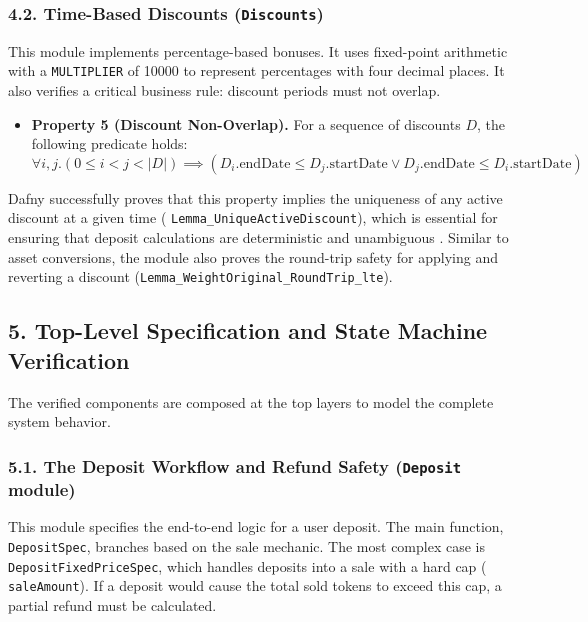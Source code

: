\documentclass[
  english,
  onecolumn]{article}
\providecommand{\tightlist}{%
  \setlength{\itemsep}{0pt}\setlength{\parskip}{0pt}}
\begin{document}
\subsubsection{\texorpdfstring{4.2. Time-Based Discounts
(\texttt{Discounts})}{4.2. Time-Based Discounts (Discounts)}}\label{time-based-discounts-discounts}

This module implements percentage-based bonuses. It uses fixed-point
arithmetic with a \texttt{MULTIPLIER} of 10000 to represent percentages
with four decimal places. It also verifies a critical business rule:
discount periods must not overlap.

\begin{itemize}
\tightlist
\item
  \textbf{Property 5 (Discount Non-Overlap).} For a sequence of
  discounts \(D\), the following predicate holds:
  \[ \forall i, j. (0 \le i < j < |D|) \implies (D_i.\text{endDate} \le D_j.\text{startDate} \lor D_j.\text{endDate} \le D_i.\text{startDate}) \]
\end{itemize}

Dafny successfully proves that this property implies the uniqueness of
any active discount at a given time (
\texttt{Lemma\_UniqueActiveDiscount}), which is essential for ensuring
that deposit calculations are deterministic and unambiguous
. Similar to asset
conversions, the module also proves the round-trip safety for applying
and reverting a discount
(\texttt{Lemma\_WeightOriginal\_RoundTrip\_lte}).

\subsection{5. Top-Level Specification and State Machine
Verification}\label{top-level-specification-and-state-machine-verification}

The verified components are composed at the top layers to model the
complete system behavior.

\subsubsection{\texorpdfstring{5.1. The Deposit Workflow and Refund
Safety (\texttt{Deposit}
module)}{5.1. The Deposit Workflow and Refund Safety (Deposit module)}}\label{the-deposit-workflow-and-refund-safety-deposit-module}

This module specifies the end-to-end logic for a user deposit. The main
function, \texttt{DepositSpec}, branches based on the sale mechanic. The
most complex case is \texttt{DepositFixedPriceSpec}, which handles
deposits into a sale with a hard cap ( \texttt{saleAmount}). If a
deposit would cause the total sold tokens to exceed this cap, a partial
refund must be calculated.
\end{document}
